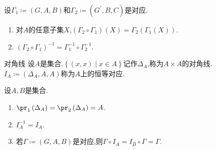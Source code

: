 \begin{proposition}{}{}
	设$\Gamma_{1}\coloneq\left(G,A,B\right)$和$\Gamma_{2}\coloneq\left(G^{\prime},B,C\right)$是对应.
	\begin{enumerate}
		\item 对$A$的任意子集$X$,$\left(\Gamma_{2}\circ\Gamma_{1}\right)\left(X\right)=\Gamma_{2}\left(\Gamma_{1}\left(X\right)\right)$.
		\item $\left(\Gamma_{2}\circ\Gamma_{1}\right)^{-1}=\Gamma_{1}^{-1}\circ\Gamma_{2}^{-1}$.
	\end{enumerate}
\end{proposition}

\begin{definition}{对角线}{}
	设$A$是集合.$\left\{\left(x,x\right)\middle|x\in A\right\}$记作$\Delta_{A}$,称为$A\times A$的对角线.$I_{A}\coloneq\left(\Delta_{A},A,A\right)$称为$A$上的恒等对应.
\end{definition}

\begin{proposition}{}{}
	设$A,B$是集合.
	\begin{enumerate}
		\item $\pr_{1}\left(\Delta_{A}\right)=\pr_{2}\left(\Delta_{A}\right)=A$.
		\item $I_{A}^{-1}=I_{A}$.
		\item 若$\Gamma\coloneq\left(G,A,B\right)$是对应,则$\Gamma\circ I_{A}=I_{B}\circ\Gamma=\Gamma$.
	\end{enumerate}
\end{proposition}

